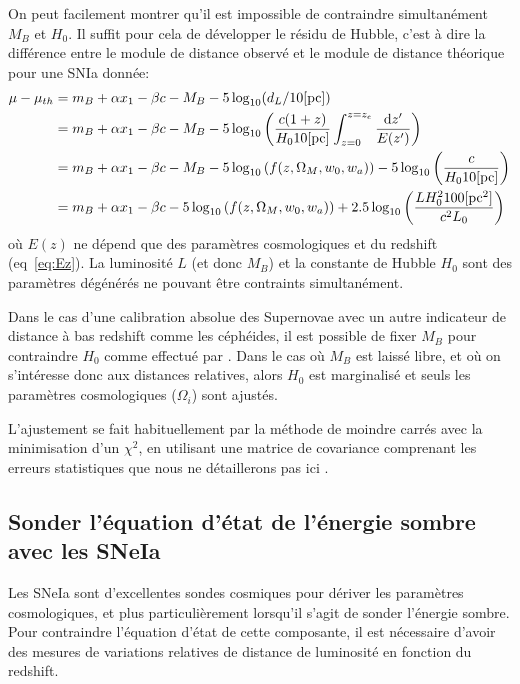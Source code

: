 \documentclass[../main/main.tex]{subfiles}
\begin{document}
On peut facilement montrer qu'il est impossible de contraindre simultanément
$M_{B}$ et $H_{0}$. Il suffit pour cela de développer le résidu de
Hubble, c'est à dire la différence entre le module de distance observé et le
module de distance théorique pour une SNIa donnée:
\begin{align}
  \mu - \mu_{th}&= m_{B}+\alpha x_{1}-\beta c -M_{B}
  -5\log_{10}(d_{L}/10[\text{pc}])\\
  &=m_{B}+\alpha x_{1}-\beta c - M_{B} -
    5\log_{10}\left(\frac{c(1+z)}{H_{0}10[\text{pc}]}\int_{z=0}^{z=z_{e}}\frac{\mathrm{d} z'}{E(z')}\right) \\
  &= m_{B}+\alpha x_{1}-\beta c - M_{B} -
    5\log_{10}\left(f(z,\Omega_{M},w_{0},w_{a})\right) -
    5\log_{10}\left(\frac{c}{H_{0}10[\text{pc}]}\right)\\
  &= m_{B}+\alpha x_{1}-\beta c -
    5\log_{10}\left(f(z,\Omega_{M},w_{0},w_{a})\right)
    +2.5\log_{10}\left(\frac{LH_{0}^{2}100[\text{pc}^{2}]}{c^{2}L_{0}}\right)
\end{align}
où $E(z)$ ne dépend que des
paramètres cosmologiques et du redshift (eq~\ref{eq:Ez}). La luminosité
$L$ (et donc $M_{B}$) et la constante de Hubble $H_{0}$ sont des paramètres dégénérés ne
pouvant être contraints simultanément.

Dans le cas d'une calibration absolue des Supernovae avec un autre
indicateur de distance à bas redshift comme les céphéides, il est possible de fixer
$M_{B}$ pour contraindre $H_0$ comme effectué par \citet{Riess2016}. Dans le cas où $M_{B}$ est laissé libre, et où on
s'intéresse donc aux distances relatives, alors $H_{0}$ est marginalisé et seuls les paramètres
cosmologiques ($\Omega_i$) sont ajustés.

L'ajustement se fait habituellement par la méthode de moindre carrés
avec la minimisation d'un $\chi^{2}$, en utilisant une matrice de
covariance comprenant les erreurs statistiques que nous
ne détaillerons pas ici \citep{Betoule2014}.

\subsection{Sonder l'équation d'état de l'énergie sombre avec les SNeIa}

Les SNeIa sont d'excellentes sondes cosmiques pour dériver les
paramètres cosmologiques, et plus particulièrement lorsqu'il s'agit de
sonder l'énergie sombre. Pour contraindre l'équation d'état de cette
composante, il est nécessaire d'avoir des mesures de variations
relatives de distance de luminosité en fonction du redshift.
\end{document}
